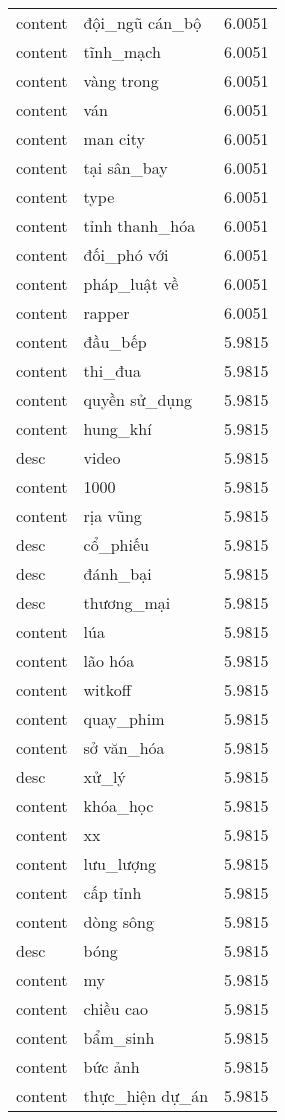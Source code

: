 \documentclass{article}
\begin{document}
\begin{tabular}{lll}
content & đội\_ngũ cán\_bộ & 6.0051\\
content & tĩnh\_mạch & 6.0051\\
content & vàng trong & 6.0051\\
content & ván & 6.0051\\
content & man city & 6.0051\\
content & tại sân\_bay & 6.0051\\
content & type & 6.0051\\
content & tỉnh thanh\_hóa & 6.0051\\
content & đối\_phó với & 6.0051\\
content & pháp\_luật về & 6.0051\\
content & rapper & 6.0051\\
content & đầu\_bếp & 5.9815\\
content & thi\_đua & 5.9815\\
content & quyền sử\_dụng & 5.9815\\
content & hung\_khí & 5.9815\\
desc & video & 5.9815\\
content & 1000 & 5.9815\\
content & rịa vũng & 5.9815\\
desc & cổ\_phiếu & 5.9815\\
desc & đánh\_bại & 5.9815\\
desc & thương\_mại & 5.9815\\
content & lúa & 5.9815\\
content & lão hóa & 5.9815\\
content & witkoff & 5.9815\\
content & quay\_phim & 5.9815\\
content & sở văn\_hóa & 5.9815\\
desc & xử\_lý & 5.9815\\
content & khóa\_học & 5.9815\\
content & xx & 5.9815\\
content & lưu\_lượng & 5.9815\\
content & cấp tỉnh & 5.9815\\
content & dòng sông & 5.9815\\
desc & bóng & 5.9815\\
content & my & 5.9815\\
content & chiều cao & 5.9815\\
content & bẩm\_sinh & 5.9815\\
content & bức ảnh & 5.9815\\
content & thực\_hiện dự\_án & 5.9815\\

\end{tabular}
\end{document}
